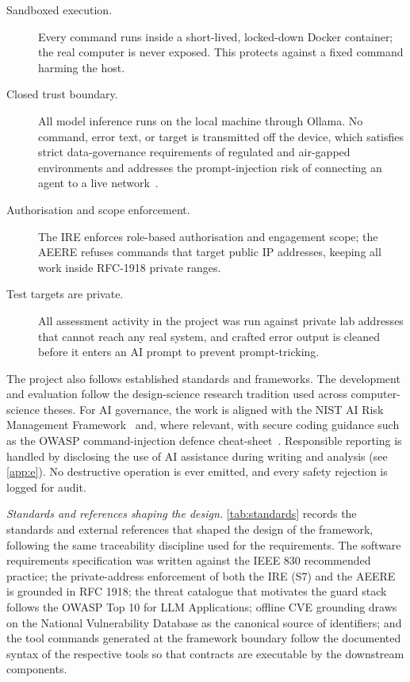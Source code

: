 \begin{description}
  \item[Sandboxed execution.] Every command runs inside a short-lived,
  locked-down Docker container; the real computer is never exposed. This
  protects against a fixed command harming the host.
  \item[Closed trust boundary.] All model inference runs on the local machine
  through Ollama. No command, error text, or target is transmitted off the
  device, which satisfies strict data-governance requirements of regulated and
  air-gapped environments and addresses the prompt-injection risk of connecting
  an agent to a live network~\cite{liu2023promptinjection}.
  \item[Authorisation and scope enforcement.] The IRE enforces role-based
  authorisation and engagement scope; the AEERE refuses commands that target
  public IP addresses, keeping all work inside RFC-1918 private ranges.
  \item[Test targets are private.] All assessment activity in the project was
  run against private lab addresses that cannot reach any real system, and
  crafted error output is cleaned before it enters an AI prompt to prevent
  prompt-tricking.
\end{description}

The project also follows established standards and frameworks. The development
and evaluation follow the design-science research tradition used across
computer-science theses. For AI governance, the work is aligned with the NIST AI
Risk Management Framework~\cite{nistairmf2023} and, where relevant, with secure
coding guidance such as the OWASP command-injection defence
cheat-sheet~\cite{owasp2025}. Responsible reporting is handled by disclosing the
use of AI assistance during writing and analysis (see
\cref{app:e}). No destructive operation is ever emitted, and every safety
rejection is logged for audit.

\emph{Standards and references shaping the design.} \cref{tab:standards}
records the standards and external references that shaped the design of the
framework, following the same traceability discipline used for the requirements.
The software requirements specification was written against the IEEE 830
recommended practice; the private-address enforcement of both the IRE (S7) and
the AEERE is grounded in RFC 1918; the threat catalogue that motivates the guard
stack follows the OWASP Top 10 for LLM Applications; offline CVE grounding draws
on the National Vulnerability Database as the canonical source of identifiers;
and the tool commands generated at the framework boundary follow the documented
syntax of the respective tools so that contracts are executable by the
downstream components.

